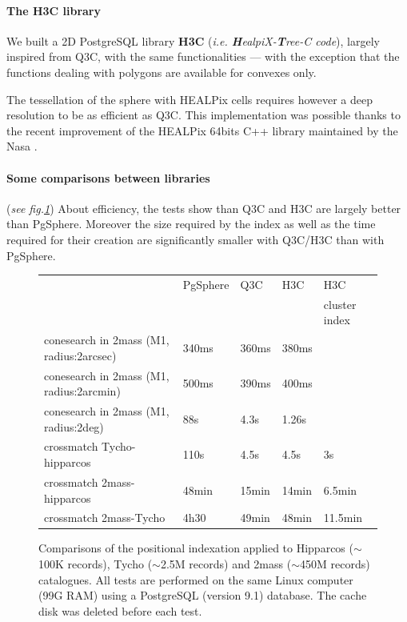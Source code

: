 \paragraph{The H3C library}

We built a 2D PostgreSQL library \textbf{H3C} 
(\textit{i.e. \textbf{H}ealpiX-\textbf{T}ree-C code}), largely inspired from
 Q3C, with the same functionalities --- with the exception that
the functions dealing with polygons are available 
for convexes only.

The tessellation of the sphere with HEALPix cells requires however
a deep resolution 
to be as efficient as Q3C. This implementation was possible thanks to the recent
improvement of the  HEALPix 64bits C++ library maintained by the Nasa 
\citep{gorski_healpix}.

\paragraph{Some comparisons between libraries} (\textit{see fig.\ref{P044:comparative}})
About efficiency, the tests show than Q3C and H3C are largely better than 
PgSphere. Moreover the size required by the index
as well as the time required for their creation
are significantly smaller with Q3C/H3C than with PgSphere.

\begin{figure}[htp] \center
\begin{small}
\begin{tabular}{lllll}
 & PgSphere & Q3C & H3C & H3C  \\
 &          &     &     &{\scriptsize cluster index} \\
conesearch in 2mass (M1, radius:2arcsec) & 340ms& 360ms& 380ms &\\
conesearch in 2mass (M1, radius:2arcmin) & 500ms& 390ms& 400ms &\\
conesearch in 2mass (M1, radius:2deg)    & 88s& 4.3s& 1.26s &\\
crossmatch Tycho-hipparcos & 110s & 4.5s &  4.5s & 3s\\ 
crossmatch 2mass-hipparcos & 48min & 15min & 14min & 6.5min\\ 
crossmatch 2mass-Tycho     & 4h30 & 49min  & 48min & 11.5min\\ 
\end{tabular}
\end{small}
\caption{Comparisons of the positional indexation applied to Hipparcos 
($\sim$100K records), Tycho ($\sim$2.5M records) and 2mass ($\sim$450M records)
catalogues. All tests are performed on the same Linux computer (99G RAM) using a
PostgreSQL (version 9.1) database. The cache disk was deleted before each test.}
\label{P044:comparative}
\end{figure}

